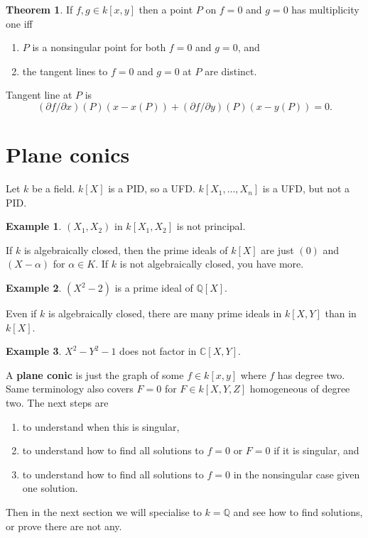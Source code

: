 \documentclass{article}
\newcommand{\Q}{\mathbb{Q}}
\newcommand{\C}{\mathbb{C}}
\newcommand{\rb}[1]{\left( #1 \right)}
\renewcommand{\sb}[1]{\left[ #1 \right]}
\theoremstyle{definition}\newtheorem{definition}{Definition}[section]
\theoremstyle{definition}\newtheorem{remark}[definition]{Remark}
\theoremstyle{definition}\newtheorem*{example}{Example}
\theoremstyle{definition}\newtheorem*{note}{Note}
\newtheorem{theorem}[definition]{Theorem}
\begin{document}
\begin{theorem}
\label{thm:2.10}
If $ f, g \in k\sb{x, y} $ then a point $ P $ on $ f = 0 $ and $ g = 0 $ has multiplicity one iff
\begin{enumerate}
\item $ P $ is a nonsingular point for both $ f = 0 $ and $ g = 0 $, and
\item the tangent lines to $ f = 0 $ and $ g = 0 $ at $ P $ are distinct.
\end{enumerate}
Tangent line at $ P $ is
$$ \rb{\partial f / \partial x}\rb{P}\rb{x - x\rb{P}} + \rb{\partial f / \partial y}\rb{P}\rb{x - y\rb{P}} = 0. $$
\end{theorem}

\section{Plane conics}

Let $ k $ be a field. $ k\sb{X} $ is a PID, so a UFD. $ k\sb{X_1, \dots, X_n} $ is a UFD, but not a PID.

\begin{example}
$ \rb{X_1, X_2} $ in $ k\sb{X_1, X_2} $ is not principal.
\end{example}

If $ k $ is algebraically closed, then the prime ideals of $ k\sb{X} $ are just $ \rb{0} $ and $ \rb{X - \alpha} $ for $ \alpha \in K $. If $ k $ is not algebraically closed, you have more.

\begin{example}
$ \rb{X^2 - 2} $ is a prime ideal of $ \Q\sb{X} $.
\end{example}

Even if $ k $ is algebraically closed, there are many prime ideals in $ k\sb{X, Y} $ than in $ k\sb{X} $.

\begin{example}
$ X^2 - Y^2 - 1 $ does not factor in $ \C\sb{X, Y} $.
\end{example}


A \textbf{plane conic} is just the graph of some $ f \in k\sb{x, y} $ where $ f $ has degree two. Same terminology also covers $ F = 0 $ for $ F \in k\sb{X, Y, Z} $ homogeneous of degree two. The next steps are
\begin{enumerate}
\item to understand when this is singular,
\item to understand how to find all solutions to $ f = 0 $ or $ F = 0 $ if it is singular, and
\item to understand how to find all solutions to $ f = 0 $ in the nonsingular case given one solution.
\end{enumerate}
Then in the next section we will specialise to $ k = \Q $ and see how to find solutions, or prove there are not any.
\end{document}

